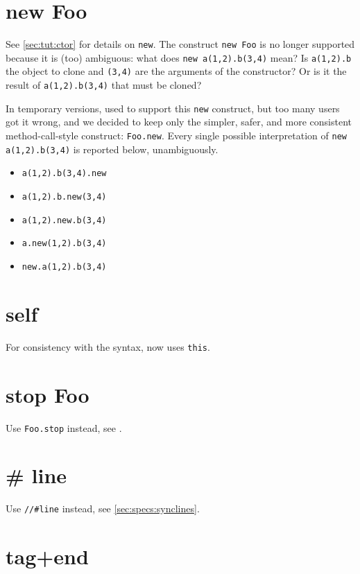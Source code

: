 \section{new Foo}

See \autoref{sec:tut:ctor} for details on \lstinline{new}.  The construct
\lstinline{new Foo} is no longer supported because it is (too) ambiguous:
what does \lstinline{new a(1,2).b(3,4)} mean?  Is
\lstinline{a(1,2).b} the object to clone and \lstinline{(3,4)} are the
arguments of the constructor?  Or is it the result of
\lstinline{a(1,2).b(3,4)} that must be cloned?

In temporary versions,  used to support this \lstinline{new} construct,
but too many users got it wrong, and we decided to keep only the
simpler, safer, and more consistent method-call-style construct:
\lstinline{Foo.new}.  Every single possible interpretation of
\lstinline{new a(1,2).b(3,4)} is reported below, unambiguously.
\begin{itemize}
\item \lstinline{a(1,2).b(3,4).new}
\item \lstinline{a(1,2).b.new(3,4)}
\item \lstinline{a(1,2).new.b(3,4)}
\item \lstinline{a.new(1,2).b(3,4)}
\item \lstinline{new.a(1,2).b(3,4)}
\end{itemize}

\section{self}
For consistency with the \Cxx syntax, \us now uses \lstinline{this}.

\section{stop Foo}

Use \lstinline{Foo.stop} instead, see .

\section{\# line}

Use \lstinline{//#line} instead, see \autoref{sec:specs:synclines}.

\section{tag+end}

